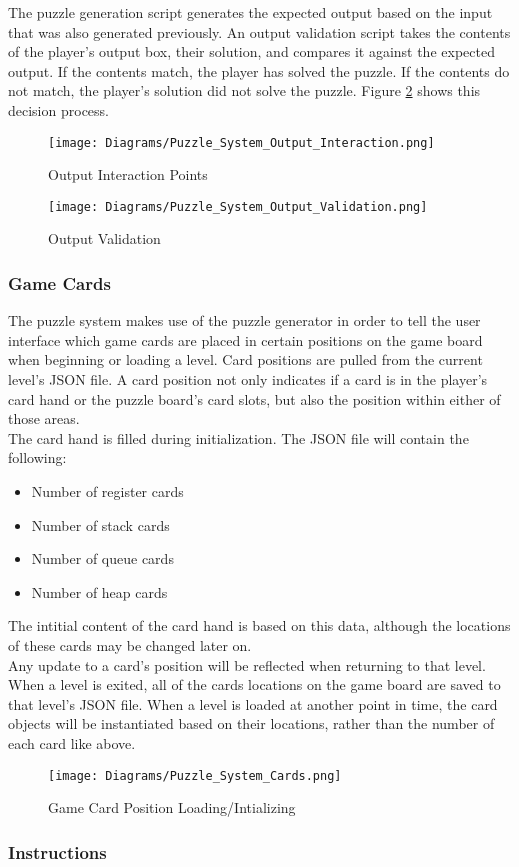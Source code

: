 The puzzle generation script generates the expected output based on the input that
was also generated previously. An output validation script takes the contents of
the player's output box, their solution, and compares it against the expected output.
If the contents match, the player has solved the puzzle. If the contents do not match,
the player's solution did not solve the puzzle. Figure \ref{fig:Puzzle_System_Output_Validation} shows this decision process.

\begin{figure}[!hb]
  \caption{Output Interaction Points}
  \label{fig:Puzzle_System_Output_Interaction}
  \centering
  \texttt{[image: Diagrams/Puzzle\_System\_Output\_Interaction.png]}
\end{figure}

\begin{figure}[!hb]
  \caption{Output Validation}
  \label{fig:Puzzle_System_Output_Validation}
  \centering
  \texttt{[image: Diagrams/Puzzle\_System\_Output\_Validation.png]}
\end{figure}
\vfill
\clearpage

\subsubsection{Game Cards}
The puzzle system makes use of the puzzle generator in order to tell the user interface
which game cards are placed in certain positions on the game board when beginning
or loading a level. Card positions are pulled from the current level's JSON file.
A card position not only indicates if a card is in the player's card hand or the puzzle board's
card slots, but also the position within either of those areas.\\

The card hand is filled during initialization. The JSON file will contain the following:
\begin{itemize}
   \item Number of register cards
   \item Number of stack cards
   \item Number of queue cards
   \item Number of heap cards
\end{itemize}

The intitial content of the card hand is based on this data, although the locations
of these cards may be changed later on.\\

Any update to a card's position will be reflected when returning to that level.
When a level is exited, all of the cards locations on the game board are saved to
that level's JSON file. When a level is loaded at another point in time, the card
objects will be instantiated based on their locations, rather than the number of
each card like above.\\

\begin{figure}[!hb]
  \caption{Game Card Position Loading/Intializing}
  \label{fig:Puzzle_System_Cards}
  \centering
  \texttt{[image: Diagrams/Puzzle\_System\_Cards.png]}
\end{figure}

\subsubsection{Instructions}
